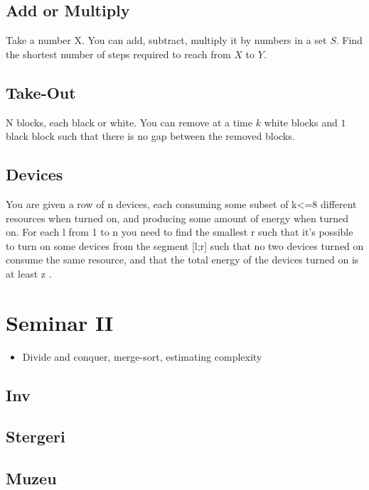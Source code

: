 \documentclass{llncs}
\begin{document}
\subsection{Add or Multiply}

Take a number X. You can add, subtract, multiply it by numbers in a set $S$. Find the shortest number of steps required to reach from $X$ to $Y$.

\subsection{Take-Out \cite{website:edu-pl:take-out}}

N blocks, each black or white. You can remove at a time $k$ white blocks and $1$ black block such that there is no gap between the removed blocks.
\subsection{Devices}
	You are given a row of n devices, each consuming some subset of k<=8 different resources when turned on, and producing some amount of energy when turned on. For each l from 1 to n you need to find the smallest r such that it's possible to turn on some devices from the segment [l;r] such that no two devices turned on consume the same resource, and that the total energy of the devices turned on is at least z \cite{website:petr1}.

\section{Seminar II}
\label{sec:seminar2}

\begin{itemize}
	\item Divide and conquer, merge-sort, estimating complexity
\end{itemize}

\subsection{Inv \cite{website:infoarena/inv}}
\subsection{Stergeri \cite{website:infoarena/stergeri}}
\subsection{Muzeu \cite{website:infoarena/muzeu}}
\end{document}
